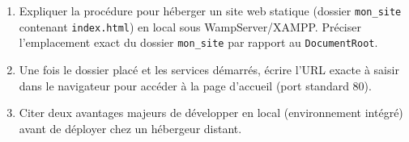 \documentclass[11pt]{article}
\begin{document}
\begin{exercice}
\begin{enumerate}
    \item Expliquer la procédure pour héberger un site web statique (dossier \texttt{mon\_site} contenant \texttt{index.html}) en local sous WampServer/XAMPP. Préciser l'emplacement exact du dossier \texttt{mon\_site} par rapport au \texttt{DocumentRoot}.
    \item Une fois le dossier placé et les services démarrés, écrire l'URL exacte à saisir dans le navigateur pour accéder à la page d'accueil (port standard 80).
    \item Citer deux avantages majeurs de développer en local (environnement intégré) avant de déployer chez un hébergeur distant.
\end{enumerate}
\end{exercice}
\end{document}
